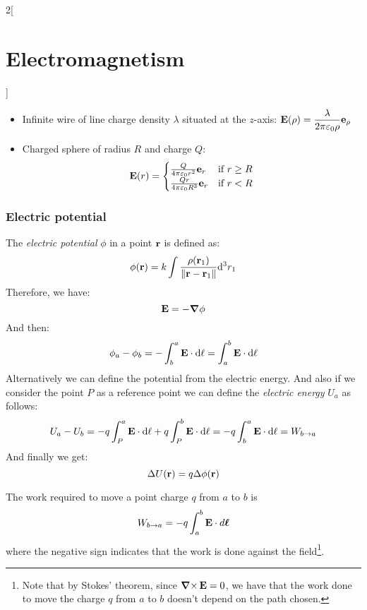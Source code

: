 \documentclass[../../../main.tex]{subfiles}
\begin{document}
\begin{multicols}{2}[\section{Electromagnetism}]
\begin{proposition}
\begin{itemize}
      \item Infinite wire of line charge density $\lambda$ situated at the $z$-axis:  $\displaystyle \boldsymbol{\mathrm{E}}(\rho)=\frac{\lambda}{2\pi\varepsilon_0 \rho}\boldsymbol{\mathrm{e}}_\rho$
      \item Charged sphere of radius $R$ and charge $Q$:
            $$\boldsymbol{\mathrm{E}}(r)=
              \begin{cases}
                \frac{Q}{4\pi\varepsilon_0r^2}\boldsymbol{\mathrm{e}}_r  & \text{if }r\geq R \\
                \frac{Qr}{4\pi\varepsilon_0R^3}\boldsymbol{\mathrm{e}}_r & \text{if }r<R
              \end{cases}
            $$
    \end{itemize}
  \end{proposition}
  \subsubsection{Electric potential}
  \begin{definition}
    The \emph{electric potential} $\phi$ in a point $\boldsymbol{\mathrm{r}}$ is defined as:
    \begin{equation}
      \phi(\boldsymbol{\mathrm{r}})=k\int\frac{\rho(\boldsymbol{\mathrm{r}}_1)}{\|\boldsymbol{\mathrm{r}}-\boldsymbol{\mathrm{r}}_1\|}\dd^3 r_1
    \end{equation}
    Therefore, we have:
    \begin{equation}
      \boldsymbol{\mathrm{E}}=-\grad\phi
      \label{E_potential}
    \end{equation}
    And then: $$\phi_a-\phi_b=-\int_b^a\boldsymbol{\mathrm{E}}\cdot \dd{\ell}=\int_a^b\boldsymbol{\mathrm{E}}\cdot \dd{\ell}$$ Alternatively we can define the potential from the electric energy.  And also if we consider the point $P$ as a reference point we can define the \emph{electric energy} $U_a$ as follows: $$U_a-U_b=-q\int_P^a\boldsymbol{\mathrm{E}}\cdot \dd{\ell}+q\int_P^b\boldsymbol{\mathrm{E}}\cdot \dd{\ell}=-q\int_b^a\boldsymbol{\mathrm{E}}\cdot \dd{\ell}=W_{b\to a}$$ And finally we get: $$\Delta U(\boldsymbol{\mathrm{r}})=q\Delta\phi(\boldsymbol{\mathrm{r}})$$
  \end{definition}
  \begin{proposition}[Work]
    The work required to move a point charge $q$ from $a$ to $b$ is $$W_{b\to a}=-q\int_a^b\boldsymbol{\mathrm{E}}\cdot d\boldsymbol{\mathrm{\ell}}$$ where the negative sign indicates that the work is done against the field\footnote{Note that by Stokes' theorem, since $\operatorname{\boldsymbol{\mathrm{\nabla}}\times}\boldsymbol{\mathrm{E}}=0$, we have that the work done to move the charge $q$ from $a$ to $b$ doesn't depend on the path chosen.}.
  \end{proposition}
  \begin{definition}

\end{definition}
\end{multicols}
\end{document}
